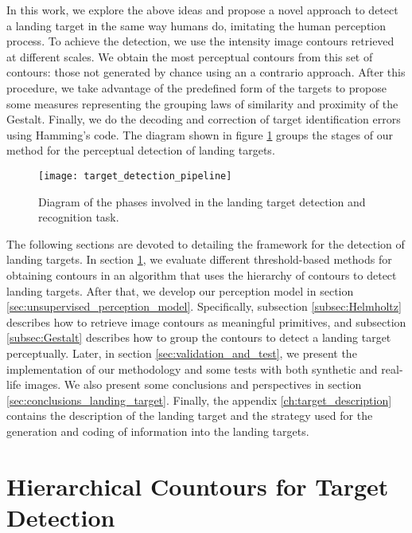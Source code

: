 In this work, we explore the above ideas and propose a novel approach to detect a landing target in the same way humans do, imitating the human perception process. To achieve the detection, we use the intensity image contours retrieved at different scales. We obtain the most perceptual contours from this set of contours: those not generated by chance using an a contrario approach. After this procedure, we take advantage of the predefined form of the targets to propose some measures representing the grouping laws of similarity and proximity of the Gestalt. Finally, we do the decoding and correction of target identification errors using Hamming's code. The diagram shown in figure \ref{fig:target_detection_pipeline} groups the stages of our method for the perceptual detection of landing targets.

\begin{figure}[!ht]
    \centering
    \texttt{[image: target\_detection\_pipeline]}        
    \caption{Diagram of the phases involved in the landing target detection and recognition task.}\label{fig:target_detection_pipeline}
\end{figure}

The following sections are devoted to detailing the framework for the detection of landing targets. In section \ref{sec:hierarchical_target_detection}, we evaluate different threshold-based methods for obtaining contours in an algorithm that uses the hierarchy of contours to detect landing targets. After that, we develop our perception model in section \ref{sec:unsupervised_perception_model}. Specifically, subsection \ref{subsec:Helmholtz} describes how to retrieve image contours as meaningful primitives, and subsection \ref{subsec:Gestalt} describes how to group the contours to detect a landing target perceptually. Later, in section \ref{sec:validation_and_test}, we present the implementation of our methodology and some tests with both synthetic and real-life images. We also present some conclusions and perspectives in section \ref{sec:conclusions_landing_target}. Finally, the appendix \ref{ch:target_description} contains the description of the landing target and the strategy used for the generation and coding of information into the landing targets.


\section{Hierarchical Countours for Target Detection}\label{sec:hierarchical_target_detection}

